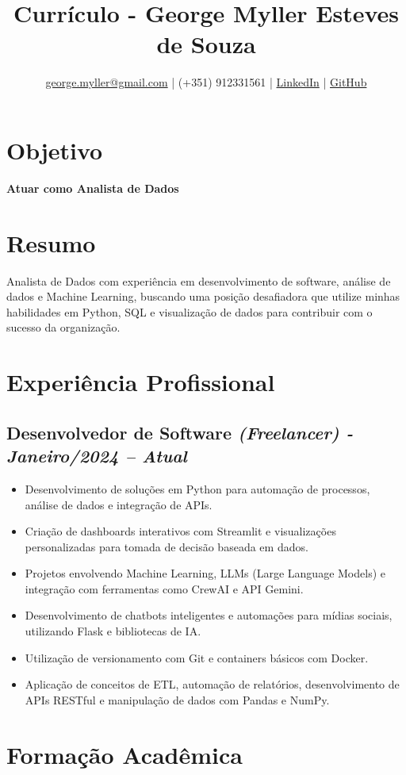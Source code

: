 \documentclass{article}
\title{Currículo - George Myller Esteves de Souza}
\author{\href{mailto:george.myller@gmail.com}{george.myller@gmail.com} | (+351) 912331561 | \href{https://linkedin.com/in/george-m-souza}{LinkedIn} | \href{https://github.com/GeorgeMyller}{GitHub}}
\date{}
\begin{document}
\maketitle

\section*{Objetivo}
\textbf{Atuar como Analista de Dados}

\section*{Resumo}
Analista de Dados com experiência em desenvolvimento de software, análise de dados e Machine Learning, buscando uma posição desafiadora que utilize minhas habilidades em Python, SQL e visualização de dados para contribuir com o sucesso da organização.

\section*{Experiência Profissional}

\subsection*{Desenvolvedor de Software \textit{(Freelancer) - Janeiro/2024 – Atual}}
\begin{itemize}
    \item Desenvolvimento de soluções em Python para automação de processos, análise de dados e integração de APIs.
    \item Criação de dashboards interativos com Streamlit e visualizações personalizadas para tomada de decisão baseada em dados.
    \item Projetos envolvendo Machine Learning, LLMs (Large Language Models) e integração com ferramentas como CrewAI e API Gemini.
    \item Desenvolvimento de chatbots inteligentes e automações para mídias sociais, utilizando Flask e bibliotecas de IA.
    \item Utilização de versionamento com Git e containers básicos com Docker.
    \item Aplicação de conceitos de ETL, automação de relatórios, desenvolvimento de APIs RESTful e manipulação de dados com Pandas e NumPy.
\end{itemize}

\section*{Formação Acadêmica}
\end{document}
